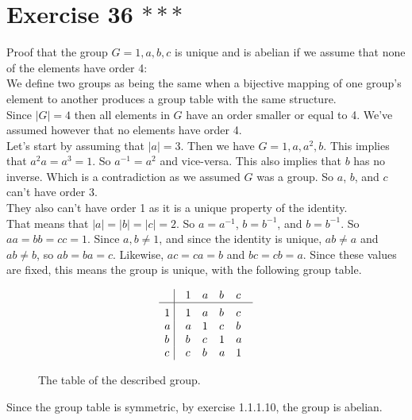 \documentclass[12pt]{article}
\begin{document}
    \section*{Exercise 36 $***$}
    Proof that the group $G = {1, a, b, c}$ is unique and is abelian
    if we assume that none of the elements have order 4: \\
    We define two groups as being the same when a bijective mapping
    of one group's element to another produces a group table with the same
    structure. \\
    Since $|G| = 4$ then all elements in $G$ have an order smaller or equal
    to 4. We've assumed however that no elements have order 4. \\
    Let's start by assuming that $|a| = 3$.
    Then we have $G = {1, a, a^2, b}$.
    This implies that $a^2a = a^3 = 1$.
    So $a^{-1} = a^2$ and vice-versa.
    This also implies that $b$ has no inverse.
    Which is a contradiction as we assumed $G$ was a group.
    So $a$, $b$, and $c$ can't have order 3. \\
    They also can't have order 1 as it is a unique property of the identity. \\
    That means that $|a| = |b| = |c| = 2$.
    So $a = a^{-1}$, $b = b^{-1}$, and $b = b^{-1}$.
    So $aa = bb = cc = 1$.
    Since $a,b \neq 1$, and since the identity is unique,
    $ab \neq a$ and $ab \neq b$,
    so $ab = ba = c$.
    Likewise, $ac = ca = b$ and $bc = cb = a$.
    Since these values are fixed, this means the group is unique, with the
    following group table.

    \begin{figure}[H]
        \centering

        \[\vbox{\tabskip0.5em\offinterlineskip
        \halign{\strut$#$\hfil\ \tabskip1em\vrule&&$#$\hfil\cr
        ~   & 1   & a   & b & c \cr
        \noalign{\hrule}\vrule height 12pt width 0pt
        1   & 1 & a & b & c \cr 
        a   & a & 1 & c & b \cr 
        b   & b & c & 1 & a \cr 
        c   & c & b & a & 1 \cr
        }}\]

        \caption{\label{fig:figure1} The table of the described group.}
    \end{figure}

    Since the group table is symmetric, by exercise 1.1.1.10,
    the group is abelian.
\end{document}
